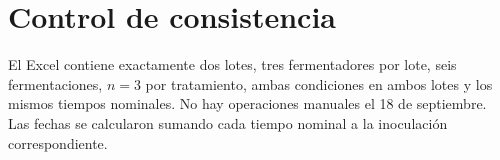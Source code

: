 \documentclass[11pt,a4paper]{article}
\begin{document}
\section*{Control de consistencia}

El Excel contiene exactamente dos lotes, tres fermentadores por lote, seis
fermentaciones, \(n=3\) por tratamiento, ambas condiciones en ambos lotes y los
mismos tiempos nominales. No hay operaciones manuales el 18 de septiembre. Las
fechas se calcularon sumando cada tiempo nominal a la inoculación correspondiente.
\end{document}
